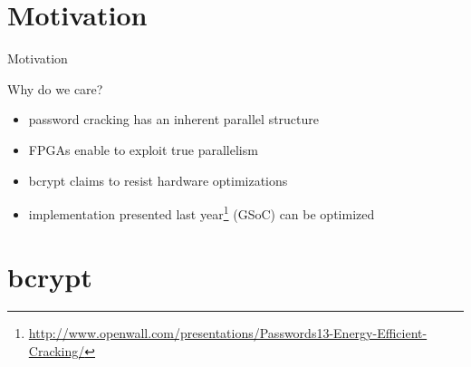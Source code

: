 
\section{Motivation}

\begin{frame}{Motivation}
    \begin{block}{Why do we care?}
      \begin{itemize}
          \item password cracking has an inherent parallel structure
          \item FPGAs enable to exploit true parallelism
      \end{itemize}
      \begin{itemize}
          \item bcrypt claims to resist hardware optimizations
          \item implementation presented last year\footnote{\tiny \url{http://www.openwall.com/presentations/Passwords13-Energy-Efficient-Cracking/}} (GSoC) can be optimized
      \end{itemize}
    \end{block}
\end{frame}

\section{bcrypt}

